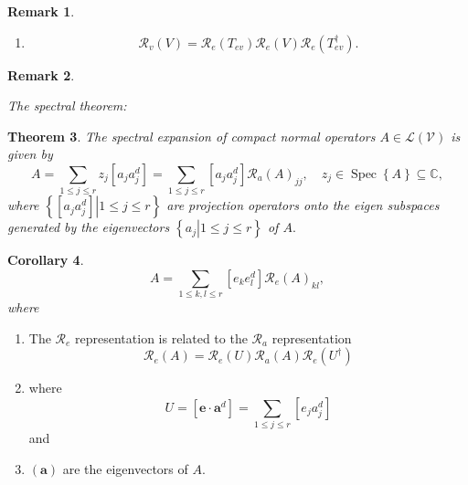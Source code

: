 \documentclass[aps,preprint]{revtex4}%
\newtheorem{theorem}{Theorem}
\newtheorem{corollary}[theorem]{Corollary}
\newtheorem{remark}[theorem]{Remark}
\begin{document}
\begin{remark}
\begin{enumerate}
\begin{enumerate}
\item
\begin{equation}
\mathcal{R}_{v}\left(  V\right)  =\mathcal{R}_{e}\left(  T_{ev}\right)
\mathcal{R}_{e}\left(  V\right)  \mathcal{R}_{e}\left(  T_{ev}^{\dagger
}\right)  .
\end{equation}

\end{enumerate}
\end{enumerate}
\end{remark}

\begin{remark}
\begin{enumerate}
The spectral theorem:
\end{enumerate}
\end{remark}

\begin{theorem}
The \emph{spectral expansion} of compact normal operators $A\in\mathcal{L}%
\left(  \mathcal{V}\right)  $ is given by
\begin{equation}
A=\sum_{1\leq j\leq r}z_{j}\left[  a_{j}a_{j}^{d}\right]  =\sum_{1\leq j\leq
r}\left[  a_{j}a_{j}^{d}\right]  \mathcal{R}_{a}\left(  A\right)  _{jj},\quad
z_{j}\in\operatorname*{Spec}\left\{  A\right\}  \subseteq\mathbb{C},
\end{equation}
where $\left\{  \left.  \left[  a_{j}a_{j}^{d}\right]  \right\vert 1\leq j\leq
r\right\}  $ are projection operators onto the eigen subspaces generated by
the eigenvectors $\left\{  \left.  a_{j}\right\vert 1\leq j\leq r\right\}  $
of $A.$
\end{theorem}

\begin{corollary}%
\begin{equation}
A=\sum_{1\leq k,l\leq r}\left[  e_{k}e_{l}^{d}\right]  \mathcal{R}_{e}\left(
A\right)  _{kl},
\end{equation}
where
\end{corollary}

\begin{enumerate}
\item The $\mathcal{R}_{e}$ representation is related to the $\mathcal{R}_{a}$
representation%
\begin{equation}
\mathcal{R}_{e}\left(  A\right)  =\mathcal{R}_{e}\left(  U\right)
\mathcal{R}_{a}\left(  A\right)  \mathcal{R}_{e}\left(  U^{\dagger}\right)
\end{equation}


\item where
\begin{equation}
U=\left[  \mathbf{e\cdot a}^{d}\right]  =\sum_{1\leq j\leq r}\left[
e_{j}a_{j}^{d}\right]
\end{equation}
and

\item $\left(  \mathbf{a}\right)  $ are the eigenvectors of $A.$
\end{enumerate}
\end{document}
